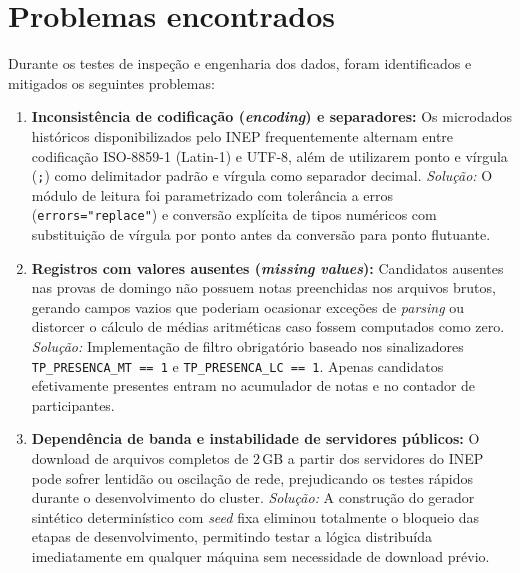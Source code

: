 \section{Problemas encontrados}

Durante os testes de inspeção e engenharia dos dados, foram identificados e
mitigados os seguintes problemas:

\begin{enumerate}
  \item \textbf{Inconsistência de codificação (\emph{encoding}) e separadores:}
    Os microdados históricos disponibilizados pelo INEP frequentemente alternam
    entre codificação ISO-8859-1 (Latin-1) e UTF-8, além de utilizarem ponto e
    vírgula (\texttt{;}) como delimitador padrão e vírgula como separador decimal.
    \emph{Solução:} O módulo de leitura foi parametrizado com tolerância a
    erros (\texttt{errors="replace"}) e conversão explícita de tipos numéricos
    com substituição de vírgula por ponto antes da conversão para ponto flutuante.
  \item \textbf{Registros com valores ausentes (\emph{missing values}):}
    Candidatos ausentes nas provas de domingo não possuem notas preenchidas nos
    arquivos brutos, gerando campos vazios que poderiam ocasionar exceções de
    \emph{parsing} ou distorcer o cálculo de médias aritméticas caso fossem
    computados como zero.
    \emph{Solução:} Implementação de filtro obrigatório baseado nos sinalizadores
    \texttt{TP\_PRESENCA\_MT == 1} e \texttt{TP\_PRESENCA\_LC == 1}. Apenas
    candidatos efetivamente presentes entram no acumulador de notas e no
    contador de participantes.
  \item \textbf{Dependência de banda e instabilidade de servidores públicos:}
    O download de arquivos completos de $2$\,GB a partir dos servidores do INEP
    pode sofrer lentidão ou oscilação de rede, prejudicando os testes rápidos
    durante o desenvolvimento do cluster.
    \emph{Solução:} A construção do gerador sintético determinístico com
    \emph{seed} fixa eliminou totalmente o bloqueio das etapas de
    desenvolvimento, permitindo testar a lógica distribuída imediatamente em
    qualquer máquina sem necessidade de download prévio.
\end{enumerate}
